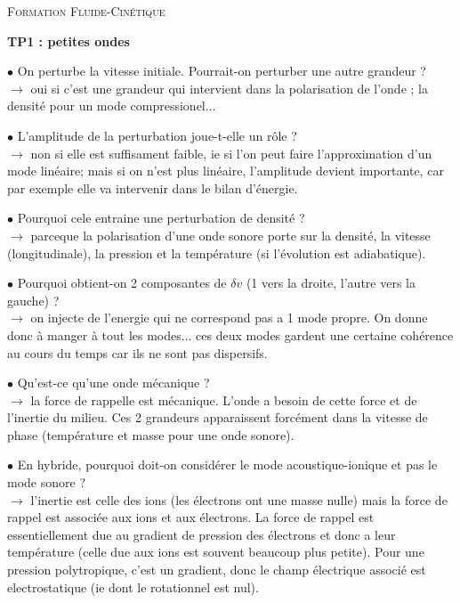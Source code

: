 \documentclass[10pt]{letter}
\begin{document}
\begin{center}
\textsc{Formation Fluide-Cinétique}
\end{center}

\bigskip

{\bf TP1 : petites ondes}

\bigskip

$\bullet$ On perturbe la vitesse initiale. Pourrait-on perturber une autre grandeur ? \\
$\rightarrow$ oui si c'est une grandeur qui intervient dans la polarisation de l'onde ; la densité pour un mode compressionel...

$\bullet$ L'amplitude de la perturbation joue-t-elle un rôle ? \\
$\rightarrow$ non si elle est suffisament faible, ie si l'on peut faire l'approximation d'un mode linéaire; mais si on n'est plus linéaire, l'amplitude devient importante, car par exemple elle va intervenir dans le bilan d'énergie.

$\bullet$ Pourquoi cele entraine une perturbation de densité ? \\
$\rightarrow$ parceque la polarisation d'une onde sonore porte sur la densité, la vitesse (longitudinale), la pression et la température (si l'évolution est adiabatique).

$\bullet$ Pourquoi obtient-on 2 composantes de $\delta v$ (1 vers la droite, l'autre vers la gauche) ? \\
$\rightarrow$ on injecte de l'energie qui ne correspond pas a 1 mode propre. On donne donc à manger à tout les modes... ces deux modes gardent une certaine cohérence au cours du temps car ils ne sont pas dispersifs.

$\bullet$ Qu'est-ce qu'une onde mécanique ? \\
$\rightarrow$ la force de rappelle est mécanique. L'onde a besoin de cette force et de l'inertie du milieu. Ces 2 grandeurs apparaissent forcément dans la vitesse de phase (température et masse pour une onde sonore).

$\bullet$ En hybride, pourquoi doit-on considérer le mode acoustique-ionique et pas le mode sonore ? \\
$\rightarrow$ l'inertie est celle des ions (les électrons ont une masse nulle) mais la force de rappel est associée aux ions et aux électrons. La force de rappel est essentiellement due au gradient de pression des électrons et donc a leur température (celle due aux ions est souvent beaucoup plus petite). Pour une pression polytropique, c'est un gradient, donc le champ électrique associé est electrostatique (ie dont le rotationnel est nul).
\end{document}
